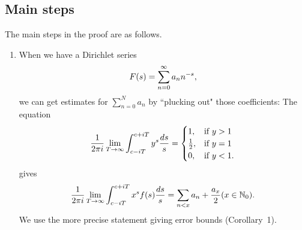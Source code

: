 \subsection{Main steps}
The main steps in the proof are as follows.
\begin{enumerate}
\item When we have a Dirichlet series
\[
F(s)=\sum_{n=0}^{\infty} a_n n^{-s},
\]
we can get estimates for $\sum_{n=0}^N a_n$ by ``plucking out" those coefficients: The equation %
\[
\frac{1}{2\pi i}\lim_{T\to\infty}\int_{c-iT}^{c+iT} y^s\frac{ds}{s}=\begin{cases}
1,&\text{if }y>1\\
\frac{1}{2},&\text{if }y=1\\
0,&\text{if }y<1.
\end{cases}
\]
gives
\[
\frac{1}{2\pi i} \lim_{T\to \infty}\int_{c-iT}^{c+iT} x^s f(s)\frac{ds}{s}=\sum_{n<x} a_n+\frac{a_x}{2}(x\in \mathbb{N}_0).
\]
We use the more precise statement giving error bounds (Corollary~1).


\end{enumerate}
